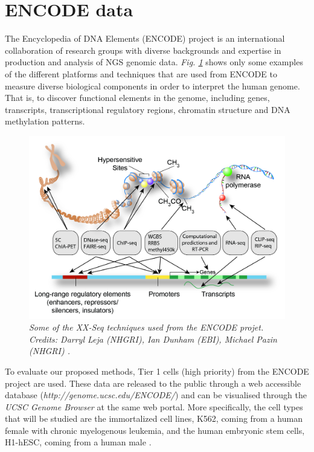 \section{ENCODE data} \label{encode-data-sect}
The Encyclopedia of DNA Elements (ENCODE) project \citep{Dunham2012} is an international collaboration of research groups with diverse backgrounds and expertise in production and analysis of NGS genomic data. \emph{Fig. \ref{encode-seq-pic}} shows only some examples of the different platforms and techniques that are used from ENCODE to measure diverse biological components in order to interpret the human genome. That is, to discover functional elements in the genome, including genes, transcripts, transcriptional regulatory regions, chromatin structure and DNA methylation patterns.

\begin{figure}[!ht]
\begin{center}
 \includegraphics[scale = 0.25]{images/encode-seq.png}
\caption{\emph{Some of the XX-Seq techniques used from the ENCODE projet. Credits: Darryl Leja (NHGRI), Ian Dunham (EBI), Michael Pazin (NHGRI) \citep{Dunham2012}.}}
\label{encode-seq-pic}
\end{center}
\end{figure} 

To evaluate our proposed methods, Tier 1 cells (\ie high priority) from the ENCODE project are used. These data are released to the public through a web accessible database (\emph{http://genome.ucsc.edu/ENCODE/}) and can be visualised through the \emph{UCSC Genome Browser} at the same web portal. More specifically, the cell types that will be studied are the immortalized cell lines, K562, coming from a human female with chronic myelogenous leukemia, and the human embryonic stem cells, H1-hESC, coming from a human male \citep{Dunham2012}.

